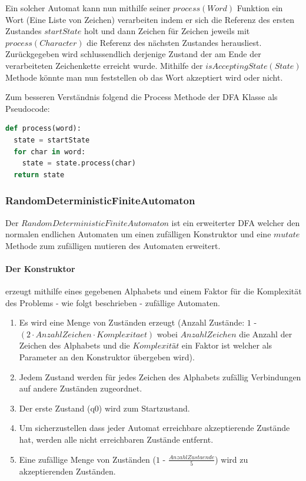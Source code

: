 Ein solcher Automat kann nun mithilfe seiner $process(Word)$ Funktion ein Wort (Eine Liste von Zeichen) verarbeiten indem er sich die Referenz des ersten Zustandes $startState$ holt und dann Zeichen für Zeichen jeweils mit $process(Character)$ die Referenz des nächsten Zustandes herausliest. Zurückgegeben wird schlussendlich derjenige Zustand der am Ende der verarbeiteten Zeichenkette erreicht wurde. Mithilfe der $isAcceptingState(State)$ Methode könnte man nun feststellen ob das Wort akzeptiert wird oder nicht. 

Zum besseren Verständnis folgend die Process Methode der DFA Klasse als Pseudocode:

\begin{lstlisting}[language=Python, caption={Process Methode der DFA Klasse}]
def process(word):
  state = startState
  for char in word:
    state = state.process(char)
  return state
\end{lstlisting}

\subsubsection{RandomDeterministicFiniteAutomaton}
Der $RandomDeterministicFiniteAutomaton$ ist ein erweiterter DFA welcher den normalen endlichen Automaten um einen zufälligen Konstruktor und eine $mutate$ Methode zum zufälligen mutieren des Automaten erweitert.

\paragraph{Der Konstruktor} erzeugt mithilfe eines gegebenen Alphabets und einem Faktor für die Komplexität des Problems - wie folgt beschrieben - zufällige Automaten.
\begin{enumerate}
  \item Es wird eine Menge von Zuständen erzeugt (Anzahl Zustände: $1$ - $(2 \cdot AnzahlZeichen \cdot Komplexitaet)$ wobei $AnzahlZeichen$ die Anzahl der Zeichen des Alphabets und die $Komplexität$ ein Faktor ist welcher als Parameter an den Konstruktor übergeben wird).
  \item Jedem Zustand werden für jedes Zeichen des Alphabets zufällig Verbindungen auf andere Zuständen zugeordnet.
  \item Der erste Zustand (q0) wird zum Startzustand.
  \item Um sicherzustellen dass jeder Automat erreichbare akzeptierende Zustände hat, werden alle nicht erreichbaren Zustände entfernt.
  \item Eine zufällige Menge von Zuständen ($1$ - $\frac{AnzahlZustaende}{5}$) wird zu akzeptierenden Zuständen.
\end{enumerate}


